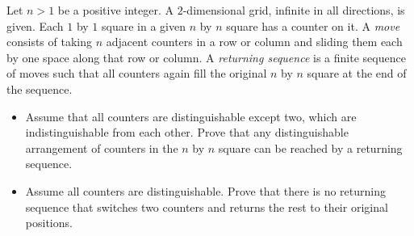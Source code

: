 Let $n > 1$ be a positive integer. A $2$-dimensional grid, infinite in all directions, is given. Each $1$ by $1$ square in a given $n$ by $n$ square has a counter on it. A \emph{move} consists of taking $n$ adjacent counters in a row or column and sliding them each by one space along that row or column. A \emph{returning sequence} is a finite sequence of moves such that all counters again fill the original $n$ by $n$ square at the end of the sequence.
\begin{itemize}
	\item Assume that all counters are distinguishable except two, which are indistinguishable from each other. Prove that any distinguishable arrangement of counters in the $n$ by $n$ square can be reached by a returning sequence.
	\item Assume all counters are distinguishable. Prove that there is no returning sequence that switches two counters and returns the rest to their original positions.
\end{itemize}